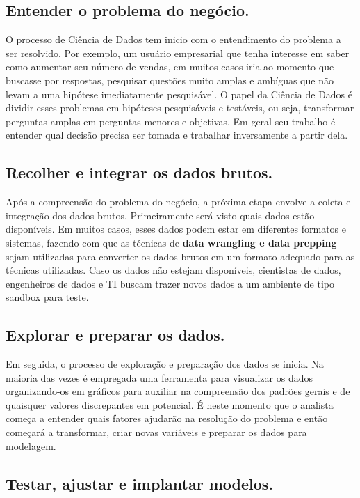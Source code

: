 \documentclass[12pt]{article}
\begin{document}
\subsection{Entender o problema do negócio.}

O processo de Ciência de Dados tem inicio com o entendimento do problema a ser resolvido. Por exemplo, um usuário empresarial que tenha interesse em saber como aumentar seu número de vendas, em muitos casos iria ao momento que buscasse por respostas, pesquisar questões muito amplas e ambíguas que não levam a uma hipótese imediatamente pesquisável. O papel da Ciência de Dados é dividir esses problemas em hipóteses pesquisáveis e testáveis, ou seja, transformar perguntas amplas em perguntas menores e objetivas. Em geral seu trabalho é entender qual decisão precisa ser tomada e trabalhar inversamente a partir dela.

\subsection{Recolher e integrar os dados brutos.}

Após a compreensão do problema do negócio, a próxima etapa envolve a coleta e integração dos dados brutos. Primeiramente será visto quais dados estão disponíveis. Em muitos casos, esses dados podem estar em diferentes formatos e sistemas, fazendo com que as técnicas de \textbf{data wrangling e data prepping} sejam utilizadas para converter os dados brutos em um formato adequado para as técnicas utilizadas. Caso os dados não estejam disponíveis, cientistas de dados, engenheiros de dados e TI buscam trazer novos dados a um ambiente de tipo sandbox para teste.

\subsection{Explorar e preparar os dados.}
    
Em seguida, o processo de exploração e preparação dos dados se inicia. Na maioria das vezes é empregada uma ferramenta para visualizar os dados organizando-os em gráficos para auxiliar na compreensão dos padrões gerais e de quaisquer valores discrepantes em potencial. É neste momento que o analista começa a entender quais fatores ajudarão na resolução do problema e então começará a transformar, criar novas variáveis e preparar os dados para modelagem.

\subsection{Testar, ajustar e implantar modelos.}
\end{document}
